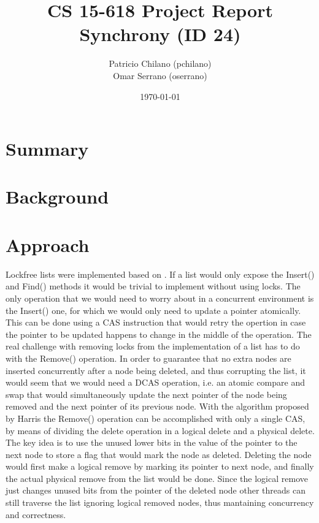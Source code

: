 \documentclass[11pt]{article}
\title{\vspace{-25pt}
\huge CS 15-618 Project Report \\
\huge Synchrony (ID 24)
}
\author{
    Patricio Chilano (pchilano) \\
    Omar Serrano (oserrano)
}
\date{\today}
\begin{document}


\maketitle

\section*{Summary}

\section*{Background}

\section*{Approach}


Lockfree lists were implemented based on \cite{Harris}.  If a list would only
expose the Insert() and Find() methods it would be trivial to implement without
using locks. The only operation that we would need to worry about in a
concurrent environment is the Insert() one, for which we would only need to
update a pointer atomically. This can be done using a CAS instruction that would
retry the opertion in case the pointer to be updated happens to change in the
middle of the operation. The real challenge with removing locks from the
implementation of a list has to do with the Remove() operation. In order to
guarantee that no extra nodes are inserted concurrently after a node being
deleted, and thus corrupting the list, it would seem that we would need a DCAS
operation, i.e. an atomic compare and swap that would simultaneously update the
next pointer of the node being removed and the next pointer of its previous
node. With the algorithm proposed by Harris the Remove() operation can be
accomplished with only a single CAS, by means of dividing the delete operation
in a logical delete and a physical delete. The key idea is to use the unused
lower bits in the value of the pointer to the next node to store a flag that
would mark the node as deleted. Deleting the node would first make a logical
remove by marking its pointer to next node, and finally the actual physical
remove from the list would be done. Since the logical remove just changes unused
bits from the pointer of the deleted node other threads can still traverse the
list ignoring logical removed nodes, thus mantaining concurrency  and
correctness.
\end{document}
